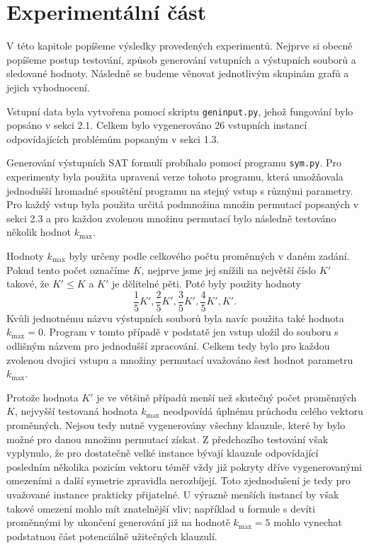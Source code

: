 
\chapter{Experimentální část}

V této kapitole popíšeme výsledky provedených experimentů. Nejprve si obecně
popíšeme postup testování, způsob generování vstupních a výstupních souborů a
sledované hodnoty. Následně se budeme věnovat jednotlivým skupinám grafů a
jejich vyhodnocení.

Vstupní data byla vytvořena pomocí skriptu \texttt{geninput.py}, jehož fungování
bylo popsáno v sekci 2.1. Celkem bylo vygenerováno 26 vstupních instancí
odpovídajících problémům popsaným v sekci 1.3.

Generování výstupních SAT formulí probíhalo pomocí programu \texttt{sym.py}.
Pro experimenty byla použita upravená verze tohoto programu, která umožňovala
jednodušší hromadné spouštění programu na stejný vstup s různými parametry. Pro každý
vstup byla použita určitá podmnožina množin permutací popsaných v sekci 2.3 a pro každou zvolenou množinu
permutací bylo následně testováno několik hodnot $k_{\max}$.

Hodnoty $k_{\max}$ byly určeny podle celkového počtu proměnných
v daném zadání. Pokud tento počet označíme $K$, nejprve jsme jej snížili na
největší číslo $K'$ takové, že $K' \leq K$ a $K'$ je dělitelné pěti. Poté byly použity
hodnoty
\[
    \frac{1}{5}K', \frac{2}{5}K', \frac{3}{5}K', \frac{4}{5}K', K'.
\]
Kvůli jednotnému názvu výstupních souborů byla navíc použita také hodnota
$k_{\max}=0$. Program v tomto případě v podstatě 
jen vstup uložil do souboru s odlišným názvem pro jednodušší zpracování.
Celkem tedy bylo pro každou zvolenou dvojici vstupu a množiny permutací uvažováno 
šest hodnot parametru $k_{\max}$.

Protože hodnota $K'$ je ve většině případů menší než skutečný počet proměnných
$K$, nejvyšší testovaná hodnota $k_{\max}$ neodpovídá úplnému průchodu
celého vektoru proměnných. Nejsou tedy nutně vygenerovány všechny klauzule,
které by bylo možné pro danou množinu permutací získat. Z předchozího testování
však vyplynulo, že pro dostatečně velké instance bývají klauzule odpovídající
posledním několika pozicím vektoru téměř vždy již pokryty dříve vygenerovanými
omezeními a další symetrie zpravidla nerozbíjejí. Toto zjednodušení je tedy pro
uvažované instance prakticky přijatelné. U výrazně menších instancí by však takové
omezení mohlo mít znatelnější vliv; například u formule s devíti proměnnými by
ukončení generování již na hodnotě $k_{\max}=5$ mohlo vynechat podstatnou část
potenciálně užitečných klauzulí.

